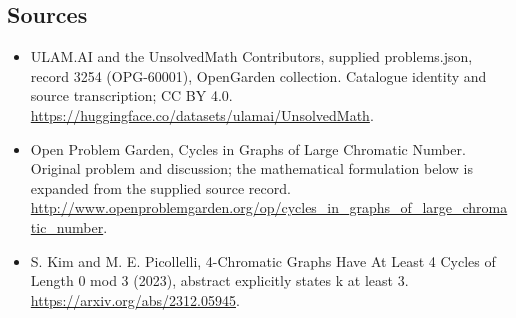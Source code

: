 \documentclass[11pt,a4paper]{article}
\begin{document}
\subsection{Sources}
\begin{itemize}
\item[S1] ULAM.AI and the UnsolvedMath Contributors, supplied problems.json, record 3254 (OPG-60001), OpenGarden collection. Catalogue identity and source transcription; CC BY 4.0.
\url{https://huggingface.co/datasets/ulamai/UnsolvedMath}.
\item[S2] Open Problem Garden, Cycles in Graphs of Large Chromatic Number. Original problem and discussion; the mathematical formulation below is expanded from the supplied source record.
\url{http://www.openproblemgarden.org/op/cycles_in_graphs_of_large_chromatic_number}.
\item[S3] S. Kim and M. E. Picollelli, 4-Chromatic Graphs Have At Least 4 Cycles of Length 0 mod 3 (2023), abstract explicitly states k at least 3.
\url{https://arxiv.org/abs/2312.05945}.
\end{itemize}
\end{document}
